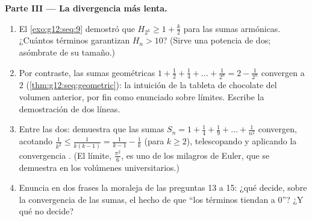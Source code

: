\begin{problem}
\medskip
\noindent\textbf{Parte III --- La divergencia más lenta.}
\begin{enumerate}[resume]
  \item El \cref{exo:g12:seq:9} demostró que
        $H_{2^k} \geq 1 + \frac k2$ para las sumas armónicas. ¿Cuántos
        términos garantizan $H_n > 10$? (Sirve una potencia de dos;
        asómbrate de su tamaño.)
  \item Por contraste, las sumas geométricas
        $1 + \frac12 + \frac14 + \dots + \frac{1}{2^n} = 2 - \frac{1}{2^n}$
        convergen a $2$ (\cref{thm:g12:seq:geometric}): la intuición de la
        tableta de chocolate del volumen anterior, por fin como enunciado
        sobre límites. Escribe la demostración de dos líneas.
  \item Entre las dos: demuestra que las sumas
        $S_n = 1 + \frac{1}{4} + \frac{1}{9} + \dots + \frac{1}{n^2}$
        convergen, acotando
        $\frac{1}{k^2} \leq \frac{1}{k(k-1)} = \frac{1}{k-1} - \frac{1}{k}$
        (para $k \geq 2$), telescopando y aplicando la convergencia
        . (El límite, $\frac{\pi^2}{6}$, es uno de los milagros de
        Euler, que se demuestra en los volúmenes universitarios.)
  \item Enuncia en dos frases la moraleja de las preguntas 13 a 15: ¿qué
        decide, sobre la convergencia de las sumas, el hecho de que ``los
        términos tiendan a $0$''? ¿Y qué no decide?
\end{enumerate}


\end{problem}
